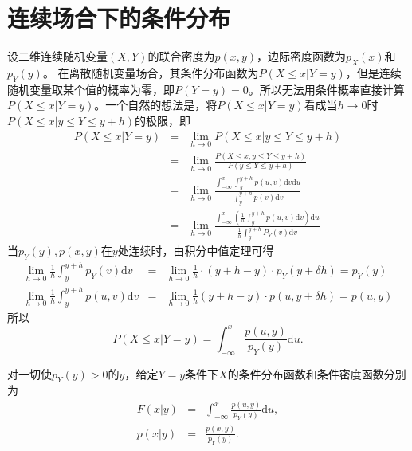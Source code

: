 \section{连续场合下的条件分布}
设二维连续随机变量$(X,Y)$的联合密度为$p(x,y)$，边际密度函数为$p_{X}(x)$和$p_{Y}(y)$。
在离散随机变量场合，其条件分布函数为$P(X\le x |  Y=y)$，但是连续随机变量取某个值的概率为零，即$P(Y=y)=0$。所以无法用条件概率直接计算$P(X\le x |  Y=y)$。一个自然的想法是，将$P(X\le x |  Y=y)$看成当$h \rightarrow 0$时$P(X\le x |  y\le Y\le y+h)$的极限，即
\begin{eqnarray*}
P(X \leq x  |  Y=y) &=&\lim _{h \rightarrow 0} P(X \leqslant x  |  y \leqslant Y \leqslant y+h) \\
&=&\lim _{h \rightarrow 0} \frac{P(X \leq x, y \leq Y \leq y+h)}{P(y \leq Y \leq y+h)} \\
&=&\lim _{h \rightarrow 0} \frac{\int_{-\infty}^{x} \int_{y}^{y+h} p(u, v) \text{d} v \text{d} u}{\int_{y}^{y+h} p(v) \text{d} v} \\
&=&\lim _{h \rightarrow 0} \frac{\int_{-\infty}^{x}\left(\frac{1}{h} \int_{y}^{y+h} p(u, v) \text{d} v\right) \text{d} u}{\frac{1}{h} \int_{y}^{y+h} P_{Y}(v) \text{d} v}
\end{eqnarray*}
当$p_{Y}(y),p(x,y)$在$y$处连续时，由积分中值定理可得\begin{eqnarray*}
\lim _{h \rightarrow 0} \frac{1}{h} \int_{y}^{y+h} p_{Y}(v) \text{d} v
&=&\lim _{h \rightarrow 0} \frac{1}{h} \cdot(y+h-y) \cdot p_{Y}(y+\delta h)=p_{Y}(y) \\
\lim _{h \rightarrow 0} \frac{1}{h} \int_{y}^{y+h} p(u, v) \text{d} v&=&\lim _{h \rightarrow 0} \frac{1}{h}(y+h-y) \cdot p(u, y+\delta h)=p(u, y)
\end{eqnarray*}
所以
$$P(X \leq x  |  Y=y)=\int_{-\infty}^{x} \frac{p(u, y)}{p_{Y}(y)} \text{d} u.$$

\begin{definition}
对一切使$p_{Y}(y)>0$的$y$，给定$Y=y$条件下$X$的条件分布函数和条件密度函数分别为
\begin{eqnarray*}
F(x  |  y)&=&\int_{-\infty}^{x} \frac{p(u, y)}{p_{Y}(y)} \text{d} u, \\
p(x  |  y)&=&\frac{p(x, y)}{p_{Y}(y)}.
\end{eqnarray*}
\end{definition}

